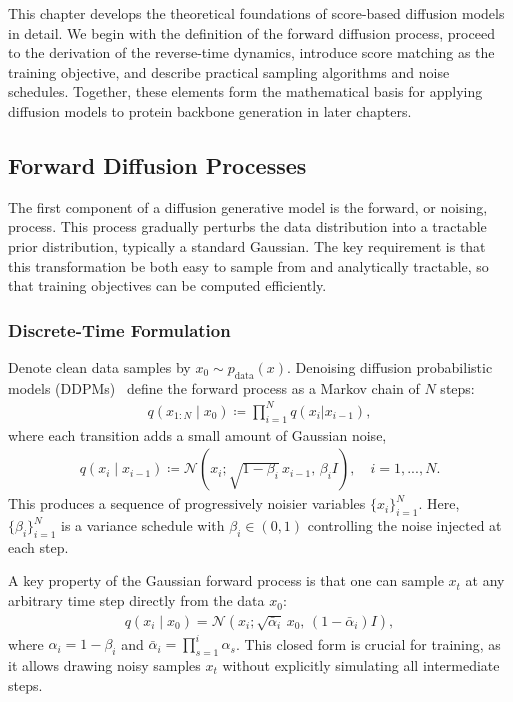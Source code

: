 \documentclass[a4paper,12pt]{article}
\begin{document}
This chapter develops the theoretical foundations of score-based diffusion models in detail. We begin with the definition of the forward diffusion process, proceed to the derivation of the reverse-time dynamics, introduce score matching as the training objective, and describe practical sampling algorithms and noise schedules. Together, these elements form the mathematical basis for applying diffusion models to protein backbone generation in later chapters.

\subsection{Forward Diffusion Processes}
The first component of a diffusion generative model is the forward, or noising, process. 
This process gradually perturbs the data distribution into a tractable prior distribution, typically a standard Gaussian. The key requirement is that this transformation be both easy to sample from and analytically tractable, so that training objectives can be computed efficiently.

\subsubsection{Discrete-Time Formulation}
Denote clean data samples by \(x_0 \sim p_{\text{data}}(x)\). Denoising diffusion probabilistic models (DDPMs)~\citep{hoDenoisingDiffusionProbabilistic2020} define the forward process as a Markov chain of \(N\) steps:
\begin{align*}
    q\left(x_{1:N}\mid x_0\right)\coloneq\prod_{i=1}^{N}q\left(x_i|x_{i-1}\right),
\end{align*}
where each transition adds a small amount of Gaussian noise,
\begin{align}\label{eq:DDPM-transition-kernel}
    q\left(x_i \mid x_{i-1}\right)\coloneq\mathcal{N}\!\left(x_i ; \sqrt{1-\beta_i}\,x_{i-1}, \, \beta_i I \right),\quad i=1,...,N.
\end{align}
This produces a sequence of progressively noisier variables \(\{x_i\}_{i=1}^N\). Here, \(\{\beta_i\}_{i=1}^N\) is a variance schedule with \(\beta_i \in (0,1)\) controlling the noise injected at each step.

A key property of the Gaussian forward process is that one can sample \(x_t\) at any arbitrary time step directly from the data \(x_0\):
\begin{align}\label{eq:DDPM-solution}
    q\left(x_i \mid x_0\right) = \mathcal{N}\!\left(x_i ; \sqrt{\bar \alpha_i}\,x_0, \,(1-\bar \alpha_i) I \right),
\end{align}
where \(\alpha_i = 1 - \beta_i\) and \(\bar \alpha_i = \prod_{s=1}^i \alpha_s\). This closed form is crucial for training, as it allows drawing noisy samples \(x_t\) without explicitly simulating all intermediate steps.
\end{document}
